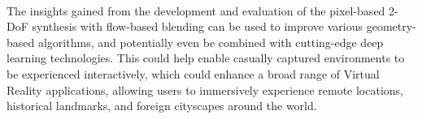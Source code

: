 
\paragraph{}

The insights gained from the development and evaluation of the pixel-based 2-DoF synthesis with flow-based blending can be used to improve various geometry-based algorithms, and potentially even be combined with cutting-edge deep learning technologies. This could help enable casually captured environments to be experienced interactively, which could enhance a broad range of Virtual Reality applications, allowing users to immersively experience remote locations, historical landmarks, and foreign cityscapes around the world.
